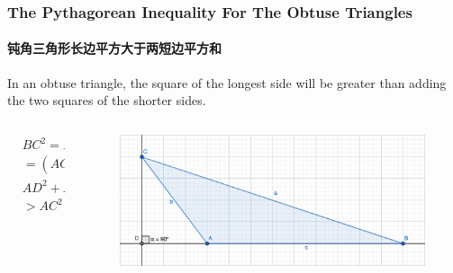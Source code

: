 \documentclass[
	11pt, %
]{beamer}
\begin{document}
\begin{frame}
	\frametitle{The Pythagorean Inequality For The Obtuse Triangles} %
	\framesubtitle{钝角三角形长边平方大于两短边平方和}
	\begin{theorem}
	In an obtuse triangle, the square of the longest side will be greater than adding the two squares of the shorter sides.
	\end{theorem}
	\begin{columns}[t] 
		\begin{column}{0.3\textwidth} %
			\begin{equation*}
				\begin{aligned}
					&BC^2 = DC^2 + DB^2 \\
					& = (AC^2 - AD^2) + \\
					& AD^2 + AB^2 + 2AD\cdot AB\\
					&>AC^2 + AB^2 \ Q.E.D.
				\end{aligned}
			\end{equation*}					
		\end{column}
		\begin{column}{0.7\textwidth} %
			\begin{figure}
				\includegraphics[width=0.8\linewidth]{Pythagorean_Obtuse.png}
			\end{figure}	
		\end{column}
	\end{columns}
\end{frame}
\end{document}
